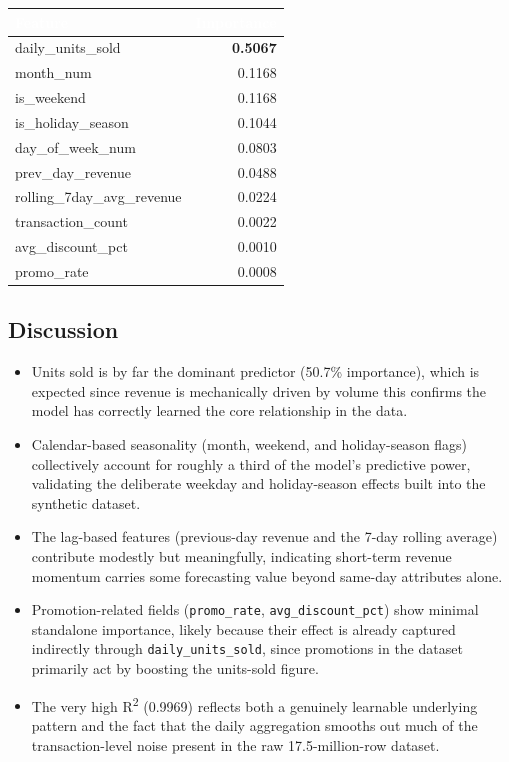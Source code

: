 \documentclass[11pt]{article}
\begin{document}
\begin{table}[H]
\centering
\begin{tabularx}{0.85\textwidth}{@{}>{\raggedright\arraybackslash}Xr@{}}
\toprule
\rowcolor{navy}\textcolor{white}{\textbf{Feature}} & \textcolor{white}{\textbf{Importance}} \\
\midrule
daily\_units\_sold & \textbf{0.5067} \\
\rowcolor{rowalt} month\_num & 0.1168 \\
is\_weekend & 0.1168 \\
\rowcolor{rowalt} is\_holiday\_season & 0.1044 \\
day\_of\_week\_num & 0.0803 \\
\rowcolor{rowalt} prev\_day\_revenue & 0.0488 \\
rolling\_7day\_avg\_revenue & 0.0224 \\
\rowcolor{rowalt} transaction\_count & 0.0022 \\
avg\_discount\_pct & 0.0010 \\
\rowcolor{rowalt} promo\_rate & 0.0008 \\
\bottomrule
\end{tabularx}
\end{table}

\subsection{Discussion}

\begin{itemize}[leftmargin=1.4em, itemsep=3pt]
    \item Units sold is by far the dominant predictor (50.7\% importance), which is expected since revenue is mechanically driven by volume this confirms the model has correctly learned the core relationship in the data.
    \item Calendar-based seasonality (month, weekend, and holiday-season flags) collectively account for roughly a third of the model's predictive power, validating the deliberate weekday and holiday-season effects built into the synthetic dataset.
    \item The lag-based features (previous-day revenue and the 7-day rolling average) contribute modestly but meaningfully, indicating short-term revenue momentum carries some forecasting value beyond same-day attributes alone.
    \item Promotion-related fields (\texttt{promo\_rate}, \texttt{avg\_discount\_pct}) show minimal standalone importance, likely because their effect is already captured indirectly through \texttt{daily\_units\_sold}, since promotions in the dataset primarily act by boosting the units-sold figure.
    \item The very high R\textsuperscript{2} (0.9969) reflects both a genuinely learnable underlying pattern and the fact that the daily aggregation smooths out much of the transaction-level noise present in the raw 17.5-million-row dataset.
\end{itemize}
\end{document}
